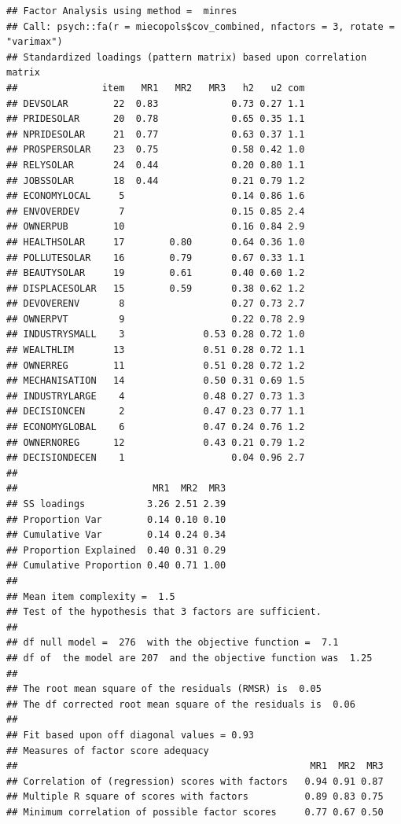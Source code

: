 \documentclass[
]{article}
\begin{document}
\begin{verbatim}
## Factor Analysis using method =  minres
## Call: psych::fa(r = miecopols$cov_combined, nfactors = 3, rotate = "varimax")
## Standardized loadings (pattern matrix) based upon correlation matrix
##               item   MR1   MR2   MR3   h2   u2 com
## DEVSOLAR        22  0.83             0.73 0.27 1.1
## PRIDESOLAR      20  0.78             0.65 0.35 1.1
## NPRIDESOLAR     21  0.77             0.63 0.37 1.1
## PROSPERSOLAR    23  0.75             0.58 0.42 1.0
## RELYSOLAR       24  0.44             0.20 0.80 1.1
## JOBSSOLAR       18  0.44             0.21 0.79 1.2
## ECONOMYLOCAL     5                   0.14 0.86 1.6
## ENVOVERDEV       7                   0.15 0.85 2.4
## OWNERPUB        10                   0.16 0.84 2.9
## HEALTHSOLAR     17        0.80       0.64 0.36 1.0
## POLLUTESOLAR    16        0.79       0.67 0.33 1.1
## BEAUTYSOLAR     19        0.61       0.40 0.60 1.2
## DISPLACESOLAR   15        0.59       0.38 0.62 1.2
## DEVOVERENV       8                   0.27 0.73 2.7
## OWNERPVT         9                   0.22 0.78 2.9
## INDUSTRYSMALL    3              0.53 0.28 0.72 1.0
## WEALTHLIM       13              0.51 0.28 0.72 1.1
## OWNERREG        11              0.51 0.28 0.72 1.2
## MECHANISATION   14              0.50 0.31 0.69 1.5
## INDUSTRYLARGE    4              0.48 0.27 0.73 1.3
## DECISIONCEN      2              0.47 0.23 0.77 1.1
## ECONOMYGLOBAL    6              0.47 0.24 0.76 1.2
## OWNERNOREG      12              0.43 0.21 0.79 1.2
## DECISIONDECEN    1                   0.04 0.96 2.7
## 
##                        MR1  MR2  MR3
## SS loadings           3.26 2.51 2.39
## Proportion Var        0.14 0.10 0.10
## Cumulative Var        0.14 0.24 0.34
## Proportion Explained  0.40 0.31 0.29
## Cumulative Proportion 0.40 0.71 1.00
## 
## Mean item complexity =  1.5
## Test of the hypothesis that 3 factors are sufficient.
## 
## df null model =  276  with the objective function =  7.1
## df of  the model are 207  and the objective function was  1.25 
## 
## The root mean square of the residuals (RMSR) is  0.05 
## The df corrected root mean square of the residuals is  0.06 
## 
## Fit based upon off diagonal values = 0.93
## Measures of factor score adequacy             
##                                                    MR1  MR2  MR3
## Correlation of (regression) scores with factors   0.94 0.91 0.87
## Multiple R square of scores with factors          0.89 0.83 0.75
## Minimum correlation of possible factor scores     0.77 0.67 0.50
\end{verbatim}
\end{document}
